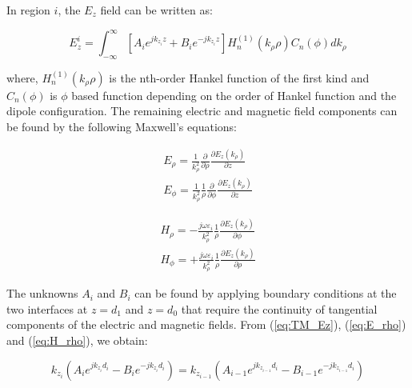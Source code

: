 \documentclass[11pt]{article}
\begin{document}
  In region $i$, the $E_z$ field can be written as:

  \begin{equation}
    E_z^i = \int_{-\infty}^{\infty} \left[ A_i e^{j k_{z_i}z} + B_i e^{-j k_{z_i}z} \right] H_n^{(1)}(k_{\rho}\rho) C_n(\phi) dk_{\rho}
    \label{eq:TM_Ez}
  \end{equation}

  where, $H_n^{(1)}(k_{\rho}\rho)$ is the nth-order Hankel function of the first kind and $C_n(\phi)$ is $\phi$ based function depending on the order of Hankel function and the dipole configuration. The remaining electric and magnetic field components can be found by the following Maxwell's equations:

  \begin{subequations}
    \begin{align}
      E_{\rho} =  \frac{1}{k_{\rho}^2} \frac{\partial}{\partial \rho} \frac{\partial E_z(k_\rho)}{\partial z}
      \label{eq:E_rho} \\
      E_{\phi} =  \frac{1}{k_{\rho}^2} \frac{1}{\rho} \frac{\partial}{ \partial \phi} \frac{\partial E_z(k_\rho)}{\partial z}
      \label{eq:E_phi}
    \end{align}
    \label{eq:E_fields}
  \end{subequations}

  \begin{subequations}
    \begin{align}
      H_{\rho} = -\frac{j\omega \varepsilon_i}{k_{\rho}^2} \frac{1}{\rho}\frac{\partial E_z(k_\rho)}{\partial \phi}
      \label{eq:H_rho} \\
      H_{\phi} =  +\frac{j\omega \varepsilon_i}{k_{\rho}^2} \frac{1}{\rho} \frac{\partial E_z(k_\rho)}{\partial \rho}
      \label{eq:H_phi}
    \end{align}
    \label{eq:H_fields}
  \end{subequations}

  The unknowns $A_i$ and $B_i$ can be found by applying boundary conditions at the two interfaces at $z = d_1$ and $z=d_0$ that require the continuity of tangential components of the electric and magnetic fields. From (\ref{eq:TM_Ez}), (\ref{eq:E_rho}) and (\ref{eq:H_rho}), we obtain:

  \begin{equation}
    k_{z_i} \left( A_i e^{jk_{z_i} d_i} - B_i e^{-jk_{z_i} d_i}  \right) = k_{z_{i-1}} \left( A_{i-1} e^{jk_{z_{i-1}} d_i} - B_{i-1} e^{-jk_{z_{i-1}} d_i}  \right)
    \label{eq:E_rho_BC}
  \end{equation}
\end{document}
